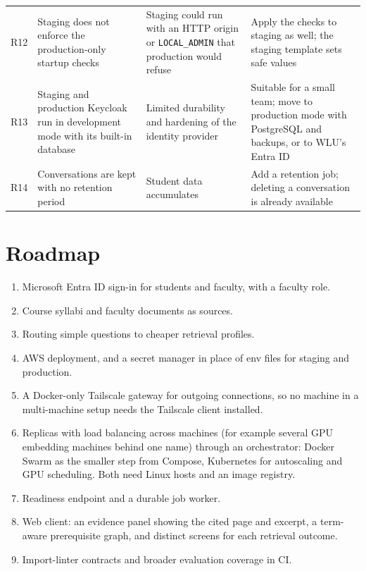\documentclass[11pt,letterpaper]{report}
\begin{document}
\begin{longtable}{@{}P{0.9cm}P{5.0cm}P{3.6cm}P{5.9cm}@{}}
R12 & Staging does not enforce the production-only startup checks & Staging could run with an HTTP origin or \texttt{LOCAL\_ADMIN} that production would refuse & Apply the checks to staging as well; the staging template sets safe values \\
R13 & Staging and production Keycloak run in development mode with its built-in database & Limited durability and hardening of the identity provider & Suitable for a small team; move to production mode with PostgreSQL and backups, or to WLU's Entra ID \\
R14 & Conversations are kept with no retention period & Student data accumulates & Add a retention job; deleting a conversation is already available \\
\bottomrule
\end{longtable}

\section{Roadmap}
\begin{enumerate}
  \item Microsoft Entra ID sign-in for students and faculty, with a faculty role.
  \item Course syllabi and faculty documents as sources.
  \item Routing simple questions to cheaper retrieval profiles.
  \item AWS deployment, and a secret manager in place of env files for staging and production.
  \item A Docker-only Tailscale gateway for outgoing connections, so no machine in a multi-machine
        setup needs the Tailscale client installed.
  \item Replicas with load balancing across machines (for example several GPU embedding machines
        behind one name) through an orchestrator: Docker Swarm as the smaller step from Compose,
        Kubernetes for autoscaling and GPU scheduling. Both need Linux hosts and an image registry.
  \item Readiness endpoint and a durable job worker.
  \item Web client: an evidence panel showing the cited page and excerpt, a term-aware prerequisite
        graph, and distinct screens for each retrieval outcome.
  \item Import-linter contracts and broader evaluation coverage in CI.
\end{enumerate}
\end{document}
